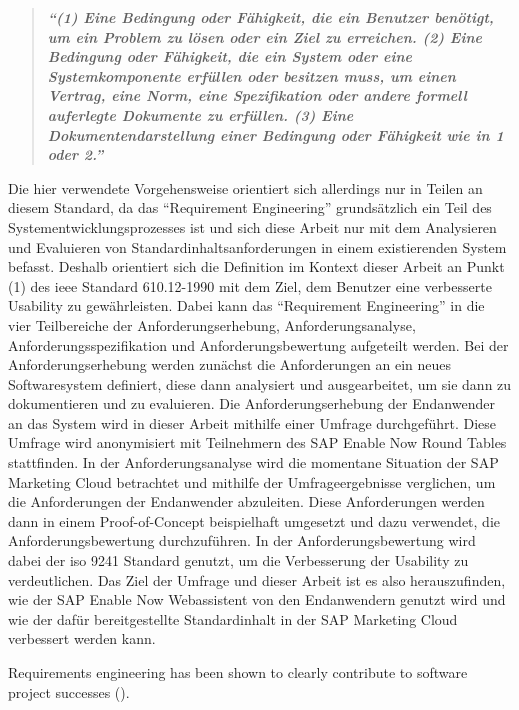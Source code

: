 \begin{quote}
\textbf{\textit{\enquote{(1) Eine Bedingung oder Fähigkeit, die ein Benutzer benötigt, um ein Problem zu lösen oder ein Ziel zu erreichen. (2) Eine Bedingung oder Fähigkeit, die ein System oder eine Systemkomponente erfüllen oder besitzen muss, um einen Vertrag, eine Norm, eine Spezifikation oder andere formell auferlegte Dokumente zu erfüllen. (3) Eine Dokumentendarstellung einer Bedingung oder Fähigkeit wie in 1 oder 2.}}} \parencite[][S.62]{IEEE.1990}
\end{quote}  %

Die hier verwendete Vorgehensweise orientiert sich allerdings nur in Teilen an diesem Standard, da das \enquote{Requirement Engineering} grundsätzlich ein Teil des Systementwicklungsprozesses ist und sich diese Arbeit nur mit dem Analysieren und Evaluieren von Standardinhaltsanforderungen in einem existierenden System befasst. Deshalb orientiert sich die Definition im Kontext dieser Arbeit an Punkt (1) des \ac{ieee} Standard 610.12-1990 mit dem Ziel, dem Benutzer eine verbesserte Usability zu gewährleisten. Dabei kann das \enquote{Requirement Engineering} in die vier Teilbereiche der Anforderungserhebung, Anforderungsanalyse, Anforderungsspezifikation und Anforderungsbewertung aufgeteilt werden. Bei der Anforderungserhebung werden zunächst die Anforderungen an ein neues Softwaresystem definiert, diese dann analysiert und ausgearbeitet, um sie dann zu dokumentieren und zu evaluieren. \parencite[Vgl.][S.82-111]{Sommerville.2011} Die Anforderungserhebung der Endanwender an das System wird in dieser Arbeit mithilfe einer Umfrage durchgeführt.  Diese Umfrage wird anonymisiert mit Teilnehmern des SAP Enable Now Round Tables stattfinden. In der Anforderungsanalyse wird die momentane Situation der SAP Marketing Cloud betrachtet und mithilfe der Umfrageergebnisse verglichen, um die Anforderungen der Endanwender abzuleiten. Diese Anforderungen werden dann in einem Proof-of-Concept beispielhaft umgesetzt und dazu verwendet, die Anforderungsbewertung durchzuführen. In der Anforderungsbewertung wird dabei der \ac{iso} 9241 Standard\parencite[][]{ISOOrg.2019}  genutzt, um die Verbesserung der Usability zu verdeutlichen. Das Ziel der Umfrage und dieser Arbeit ist es also herauszufinden, wie der SAP Enable Now Webassistent von den Endanwendern genutzt wird und wie der dafür bereitgestellte Standardinhalt in der SAP Marketing Cloud verbessert werden kann.

Requirements engineering has been shown to clearly contribute to software project successes (\cite{Hofmann.2001}).